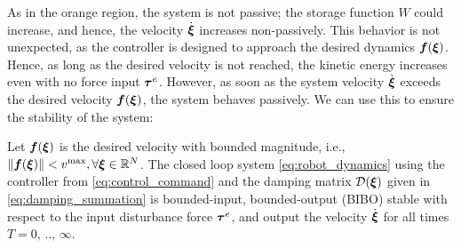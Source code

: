 As in the orange region, the system is not passive; the storage function $W$ could increase, and hence, the velocity $\dot {\boldsymbol{\xi}}$ increases non-passively. This behavior is not unexpected, as the controller is designed to approach the desired dynamics $\boldsymbol{f}({\boldsymbol{\xi}})$. Hence, as long as the desired velocity is not reached, the kinetic energy increases even with no force input $\boldsymbol{\tau}^e$. However, as soon as the system velocity $\dot{\boldsymbol{\xi}}$ exceeds the desired velocity $\boldsymbol{f}(\boldsymbol{\xi})$, the system behaves passively. We can use this to ensure the stability of the system:

\begin{theorem}  \label{theorem:passivity}
  Let $\boldsymbol{f}(\boldsymbol{\xi})$ is the desired velocity with bounded magnitude, i.e., $\| \boldsymbol{f}(\boldsymbol{\xi}) \| < v^{\mathrm{max}}, \forall \boldsymbol{\xi} \in \mathbb{R}^N$.
   The closed loop system \eqref{eq:robot_dynamics} using the controller from \eqref{eq:control_command} and the damping matrix $\mathcal{D}(\boldsymbol{\xi})$ given in \eqref{eq:damping_summation} is bounded-input, bounded-output (BIBO) stable with respect to the input disturbance force $\boldsymbol{\tau}^e$, and output the velocity $\dot{\boldsymbol{\xi}}$ for all times $T = 0, \, .., \, \infty$.
\end{theorem}
 
